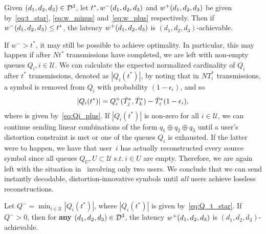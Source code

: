 \begin{theorem}
\label{thm:w_minus}
	Given $(d_1, d_2, d_3) \in \mathcal{D}^{3}$, let $t^{*}, w^{-}(d_1, d_2, d_3)$ and $w^{+}(d_1, d_2, d_3)$ be given by~\eqref{eq:t_star}, \eqref{eq:w_minus} and~\eqref{eq:w_plus} respectively.  Then if $w^{-}(d_1, d_2, d_3) \leq t^{*}$, the latency $w^{+}(d_1, d_2, d_3)$ is $(d_1, d_2, d_3)$-achievable.
\end{theorem}
%
If $w^{-} > t^{*}$,  it may still be possible to achieve optimality.  In particular, this may happen if after $Nt^{*}$ transmissions have completed, we are left with non-empty queues $Q_i, i\in \mathcal{U}$. %
We can calculate the expected normalized cardinality of $Q_i$ after $t^{*}$ transmissions, denoted as $| Q_i(t^{*}) |$, by noting that in $NT_i^{*}$ transmissions, a symbol is removed from $Q_i$ with probability $(1 - \epsilon_i)$, and so
%
\begin{equation}
\label{eq:Q_t_star}
	| Q_i(t^{*}) | = Q_{i}^{+}(\bar{T}_{j}^{*},\bar{T}_{k}^{*}) - \bar{T}_i^{*}(1 - \epsilon_i),
\end{equation}
%
where  is given by~\eqref{eq:Qi_plus}.
If $| Q_i(t^{*}) |$ is non-zero for all $i \in \mathcal{U}$, we can continue sending linear combinations of the form $q_1 \oplus q_2 \oplus q_3$ until a user's distortion constraint is met or one of the queues $Q_i$ is exhausted.  If the latter were to happen, we have that user~$i$ has actually reconstructed every source symbol since all queues $Q_U, U \subset \mathcal{U} \ s.t.\ i \in U$ are empty.  Therefore, we are again left with the situation in~\cite{TMKS_TIT20} involving only two users. We conclude that we can send instantly decodable, distortion-innovative symbols until \emph{all} users achieve lossless reconstructions.

\begin{theorem}
\label{thm:all}
	Let $Q^{-} = \min_{i \in \mathcal{U}} |Q_i(t^{*})|$, where $|Q_i(t^{*})|$ is given by~\eqref{eq:Q_t_star}.  If $Q^{-} > 0$, then for \textbf{any} $(d_1, d_2, d_3) \in \mathcal{D}^{3}$, the latency $w^{+}(d_1, d_2, d_3)$ is $(d_1, d_2, d_3)$-achievable.
\end{theorem}


